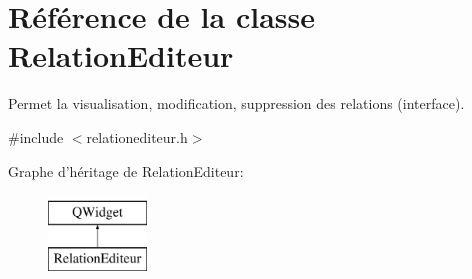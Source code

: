 \hypertarget{class_relation_editeur}{\section{Référence de la classe Relation\-Editeur}
\label{class_relation_editeur}
}


Permet la visualisation, modification, suppression des relations (interface).  




{\ttfamily \#include $<$relationediteur.\-h$>$}

Graphe d'héritage de Relation\-Editeur\-:\begin{figure}[H]
\begin{center}
\leavevmode
\includegraphics[height=2.000000cm]{class_relation_editeur}
\end{center}
\end{figure}

